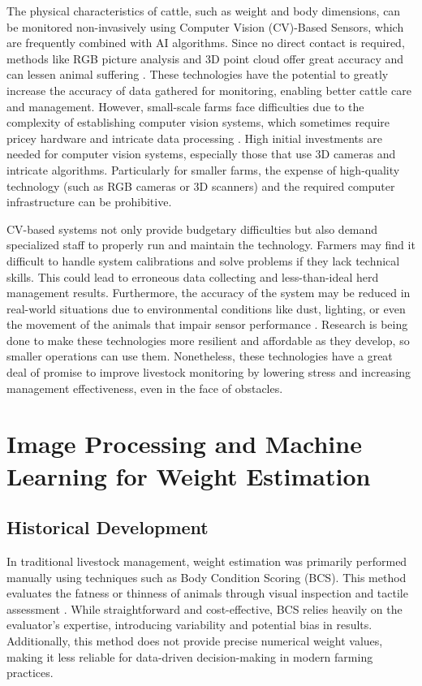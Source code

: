 {The physical characteristics of cattle, such as weight and body dimensions, can be monitored non-invasively using Computer Vision (CV)-Based Sensors, which are frequently combined with AI algorithms. Since no direct contact is required, methods like RGB picture analysis and 3D point cloud offer great accuracy and can lessen animal suffering \citep{ma2024computer}. These technologies have the potential to greatly increase the accuracy of data gathered for monitoring, enabling better cattle care and management. However, small-scale farms face difficulties due to the complexity of establishing computer vision systems, which sometimes require pricey hardware and intricate data processing \citep{terence2024systematic}.  High initial investments are needed for computer vision systems, especially those that use 3D cameras and intricate algorithms. Particularly for smaller farms, the expense of high-quality technology (such as RGB cameras or 3D scanners) and the required computer infrastructure can be prohibitive. 

CV-based systems not only provide budgetary difficulties but also demand specialized staff to properly run and maintain the technology. Farmers may find it difficult to handle system calibrations and solve problems if they lack technical skills. This could lead to erroneous data collecting and less-than-ideal herd management results. Furthermore, the accuracy of the system may be reduced in real-world situations due to environmental conditions like dust, lighting, or even the movement of the animals that impair sensor performance \citep{ma2024computer}. Research is being done to make these technologies more resilient and affordable as they develop, so smaller operations can use them. Nonetheless, these technologies have a great deal of promise to improve livestock monitoring by lowering stress and increasing management effectiveness, even in the face of obstacles.

\section{Image Processing and Machine Learning for Weight Estimation}

\subsection{Historical Development}

In traditional livestock management, weight estimation was primarily performed manually using techniques such as Body Condition Scoring (BCS). This method evaluates the fatness or thinness of animals through visual inspection and tactile assessment \citep{bercovich2013development}. While straightforward and cost-effective, BCS relies heavily on the evaluator's expertise, introducing variability and potential bias in results. Additionally, this method does not provide precise numerical weight values, making it less reliable for data-driven decision-making in modern farming practices.

}
